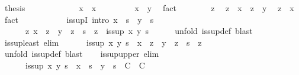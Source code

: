 \begin{isabellebody}
\ {\isacharquery}thesis\isanewline
\ \ \ \ \isamarkupfalse%
\isanewline
\ \ \ \ \ \ \isamarkupfalse%
\ {\isachardoublequoteopen}x\ {\isasymsqsubseteq}\ x{\isachardoublequoteclose}\ \isacommand{{\isachardot}{\isachardot}}\isamarkupfalse%
\isanewline
\ \ \ \ \ \ \isamarkupfalse%
\ {\isachardoublequoteopen}x\ {\isasymsqsubseteq}\ y{\isachardoublequoteclose}\ \isamarkupfalse%
\ fact\isanewline
\ \ \ \ \ \ \isamarkupfalse%
\ z\ \isamarkupfalse%
\ {\isachardoublequoteopen}z\ {\isasymsqsubseteq}\ x{\isachardoublequoteclose}\ \ {\isachardoublequoteopen}z\ {\isasymsqsubseteq}\ y{\isachardoublequoteclose}\ \isamarkupfalse%
\ {\isachardoublequoteopen}z\ {\isasymsqsubseteq}\ x{\isachardoublequoteclose}\ \isamarkupfalse%
\ fact\isanewline
\ \ \ \ \isamarkupfalse%
\isanewline
\ \ \isamarkupfalse%
\isanewline
\isanewline
\ \ \isamarkupfalse%
\ is{\isacharunderscore}supI\ {\isacharbrackleft}intro{\isacharquery}{\isacharbrackright}{\isacharcolon}\ {\isachardoublequoteopen}x\ {\isasymsqsubseteq}\ s\ {\isasymLongrightarrow}\ y\ {\isasymsqsubseteq}\ s\ {\isasymLongrightarrow}\isanewline
\ \ \ \ \ \ {\isacharparenleft}{\isasymAnd}z{\isachardot}\ x\ {\isasymsqsubseteq}\ z\ {\isasymLongrightarrow}\ y\ {\isasymsqsubseteq}\ z\ {\isasymLongrightarrow}\ s\ {\isasymsqsubseteq}\ z{\isacharparenright}\ {\isasymLongrightarrow}\ is{\isacharunderscore}sup\ x\ y\ s{\isachardoublequoteclose}\isanewline
\ \ \ \ \isamarkupfalse%
\ {\isacharparenleft}unfold\ is{\isacharunderscore}sup{\isacharunderscore}def{\isacharparenright}\ blast\isanewline
\isanewline
\ \ \isamarkupfalse%
\ is{\isacharunderscore}sup{\isacharunderscore}least\ {\isacharbrackleft}elim{\isacharquery}{\isacharbrackright}{\isacharcolon}\isanewline
\ \ \ \ \ \ {\isachardoublequoteopen}is{\isacharunderscore}sup\ x\ y\ s\ {\isasymLongrightarrow}\ x\ {\isasymsqsubseteq}\ z\ {\isasymLongrightarrow}\ y\ {\isasymsqsubseteq}\ z\ {\isasymLongrightarrow}\ s\ {\isasymsqsubseteq}\ z{\isachardoublequoteclose}\isanewline
\ \ \ \ \isamarkupfalse%
\ {\isacharparenleft}unfold\ is{\isacharunderscore}sup{\isacharunderscore}def{\isacharparenright}\ blast\isanewline
\isanewline
\ \ \isamarkupfalse%
\ is{\isacharunderscore}sup{\isacharunderscore}upper\ {\isacharbrackleft}elim{\isacharquery}{\isacharbrackright}{\isacharcolon}\isanewline
\ \ \ \ \ \ {\isachardoublequoteopen}is{\isacharunderscore}sup\ x\ y\ s\ {\isasymLongrightarrow}\ {\isacharparenleft}x\ {\isasymsqsubseteq}\ s\ {\isasymLongrightarrow}\ y\ {\isasymsqsubseteq}\ s\ {\isasymLongrightarrow}\ C{\isacharparenright}\ {\isasymLongrightarrow}\ C{\isachardoublequoteclose}\isanewline

\end{isabellebody}
